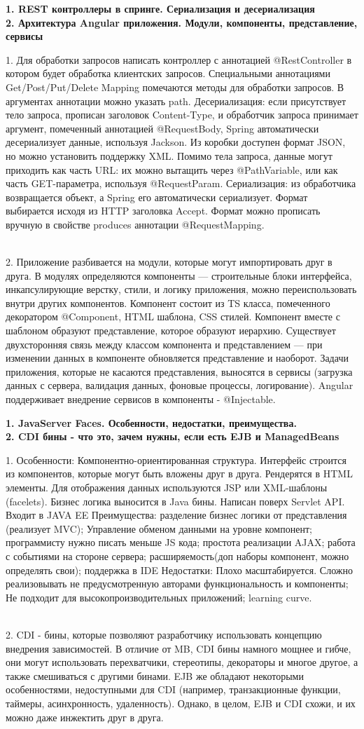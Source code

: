 \documentclass{article}
\newcommand{\bil}[4]{%
    \begin{minipage}{.3\textwidth}
        \textbf{1. #1} \\
        \textbf{2. #2}

        1. #3
        \\
        2. #4
    \end{minipage}
}
\begin{document}
\bil{REST контроллеры в спринге. Сериализация и десериализация}{Архитектура Angular приложения. Модули, компоненты, представление, сервисы}{
    Для обработки запросов написать контроллер с аннотацией @RestController в котором будет обработка клиентских запросов.
    Специальными аннотациями Get/Post/Put/Delete Mapping помечаются методы для обработки запросов. 
    В аргументах аннотации можно указать path.
    Десериализация: если присутствует тело запроса, прописан заголовок Content-Type, и обработчик запроса принимает аргумент, помеченный аннотацией @RequestBody, 
    Spring автоматически десериализует данные, используя Jackson. Из коробки доступен формат JSON, но можно установить поддержку XML. Помимо тела запроса, данные могут приходить как часть URL: 
    их можно вытащить через @PathVariable, или как часть GET-параметра, используя @RequestParam.
    Сериализация: из обработчика возвращается объект, а Spring его автоматически сериализует. 
    Формат выбирается исходя из HTTP заголовка Accept. Формат можно прописать вручную в свойстве produces аннотации @RequestMapping.
}{
    Приложение разбивается на модули, которые могут импортировать друг в друга. 
    В модулях определяются компоненты — строительные блоки интерфейса, инкапсулирующие верстку, стили, и логику приложения, можно переиспользовать внутри других компонентов. 
    Компонент состоит из TS класса, помеченного декоратором @Component, HTML шаблона, CSS стилей. 
    Компонент вместе с шаблоном образуют представление, которое образуют иерархию. 
    Существует двухсторонняя связь между классом компонента и представлением — при изменении данных в компоненте обновляется представление и наоборот.
    Задачи приложения, которые не касаются представления, выносятся в сервисы (загрузка данных с сервера, валидация данных, фоновые процессы, логирование). 
    Angular поддерживает внедрение сервисов в компоненты - @Injectable.
}
\hfill
\bil{JavaServer Faces. Особенности, недостатки, преимущества.}{CDI бины - что это, зачем нужны, если есть EJB и ManagedBeans}{
    Особенности: Компонентно-ориентированная структура. Интерфейс строится из компонентов, которые могут быть вложены друг в друга. Рендерятся в HTML элементы.
    Для отображения данных используются JSP или XML-шаблоны (facelets).
    Бизнес логика выносится в Java бины.
    Написан поверх Servlet API. Входит в JAVA EE
    Преимущества: разделение бизнес логики от представления (реализует MVC);
    Управление обменом данными на уровне компонент;
    программисту нужно писать меньше JS кода;
    простота реализации AJAX;
    работа с событиями на стороне сервера;
    расширяемость(доп наборы компонент, можно определять свои);
    поддержка в IDE
    Недостатки:
    Плохо масштабируется. Сложно реализовывать не предусмотренную авторами функциональность и компоненты;
    Не подходит для высокопроизводительных приложений;
    learning curve.
}{
    CDI - бины, которые позволяют разработчику использовать концепцию внедрения зависимостей. 
    В отличие от MB, CDI бины намного мощнее и гибче, они могут использовать перехватчики, стереотипы, декораторы и многое другое, а также смешиваться с другими бинами. 
    EJB же обладают некоторыми особенностями, недоступными для CDI (например, транзакционные функции, таймеры, асинхронность, удаленность). 
    Однако, в целом, EJB и CDI схожи, и их можно даже инжектить друг в друга. 
}
\end{document}
